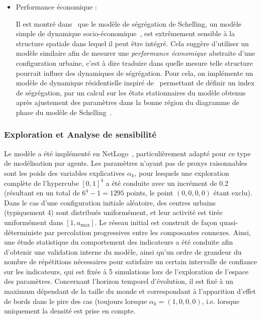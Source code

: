 \documentclass[french,12pt]{article}
\begin{document}
\begin{itemize}
\item Performance économique :

Il est montré dans~\cite{banos2012network} que le modèle de ségrégation de Schelling, un modèle simple de dynamique socio-économique~\cite{schelling1969models}, est extrêmement sensible à la structure spatiale dans lequel il peut être intégré. Cela suggère d’utiliser un modèle similaire afin de mesurer une \emph{performance économique} abstraite d’une configuration urbaine, c’est à dire traduire dans quelle mesure telle structure pourrait influer des dynamiques de ségrégation. Pour cela, on implémente un modèle de dynamique résidentielle inspiré de~\cite{benenson1998multi} permettant de définir un index de ségrégation, par un calcul sur les états stationnaires du modèle obtenus après ajustement des paramètres dans la bonne région du diagramme de phase du modèle de Schelling~\cite{gauvin2009phase}.


\end{itemize}




\subsubsection{Exploration et Analyse de sensibilité}

Le modèle a été implémenté en NetLogo~\cite{NetLogo}, particulièrement adapté pour ce type de modélisation par agents. Les paramètres n’ayant pas de proxys raisonnables sont les poids des variables explicatives $\alpha_k$, pour lesquels une exploration complète de l’hypercube $[0,1]^4$ a été conduite avec un incrément de 0.2 (résultant en un total de $6^4-1=1295$ points, le point $(0,0,0,0)$ étant exclu). Dans le cas d’une configuration initiale aléatoire, des centres urbains (typiquement 4) sont distribués uniformément, et leur activité est tirée uniformément dans $[1,a_{\max}]$. Le réseau initial est construit de façon quasi-déterministe par percolation progressives entre les composantes connexes. Ainsi, une étude statistique du comportement des indicateurs a été conduite afin d’obtenir une validation interne du modèle, ainsi qu’un ordre de grandeur du nombre de répétitions nécessaires pour satisfaire un certain intervalle de confiance sur les indicateurs, qui est fixée à 5 simulations lors de l’exploration de l’espace des paramètres. Concernant l’horizon temporel d’évolution, il est fixé à un maximum dépendant de la taille du monde et correspondant à l’apparition d’effet de bords dans le pire des cas (toujours lorsque  $\alpha_k=(1,0,0,0)$, i.e. lorsque uniquement la densité est prise en compte.
\end{document}
